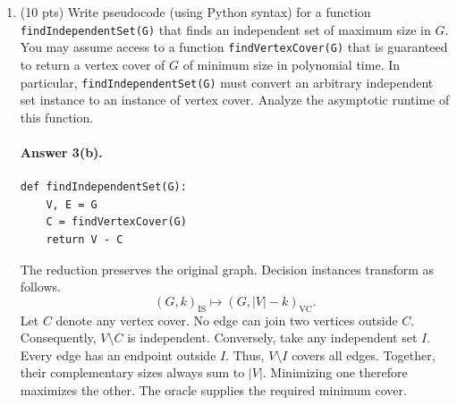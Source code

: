 \documentclass{article}
\begin{document}
\begin{enumerate}
\begin{enumerate}
\par\noindent\begin{minipage}{\linewidth}
\begin{lstlisting}
def checkVertexCover(G, k, C):
    V, E = G
    if len(C) > k or not C.issubset(V):
        return False
    for u, v in E:
        if u not in C and v not in C:
            return False
    return True
\end{lstlisting}
\end{minipage}\par

The first check rejects oversized or invalid certificates.
Each remaining edge needs one selected endpoint.
Any uncovered edge causes rejection.
Otherwise, every edge is covered within budget.
This matches the vertex cover definition.

Membership checks take expected constant time here.
The expected runtime is $O(1+|C|+|E|)$.
Valid certificates satisfy $|C|\leq |V|$.
Hence, $O(1+|V|+|E|)$ bounds valid inputs.
Auxiliary space remains constant.

        \item (10 pts) Write pseudocode (using Python syntax) for a function \verb|findIndependentSet(G)| that finds an independent set of maximum size in $G$. You may assume access to a function \verb|findVertexCover(G)| that is guaranteed to return a vertex cover of $G$ of minimum size in polynomial time. In particular, \verb|findIndependentSet(G)| must convert an arbitrary independent set instance to an instance of vertex cover. Analyze the asymptotic runtime of this function.


\paragraph{Answer 3(b).}\mbox{}\par
\par\noindent\begin{minipage}{\linewidth}
\begin{lstlisting}
def findIndependentSet(G):
    V, E = G
    C = findVertexCover(G)
    return V - C
\end{lstlisting}
\end{minipage}\par

The reduction preserves the original graph.
Decision instances transform as follows.
\[
(G,k)_{\mathrm{IS}}\longmapsto(G,|V|-k)_{\mathrm{VC}}.
\]
Let $C$ denote any vertex cover.
No edge can join two vertices outside $C$.
Consequently, $V\setminus C$ is independent.
Conversely, take any independent set $I$.
Every edge has an endpoint outside $I$.
Thus, $V\setminus I$ covers all edges.
Together, their complementary sizes always sum to $|V|$.
Minimizing one therefore maximizes the other.
The oracle supplies the required minimum cover.


\end{enumerate}
\end{enumerate}
\end{document}
